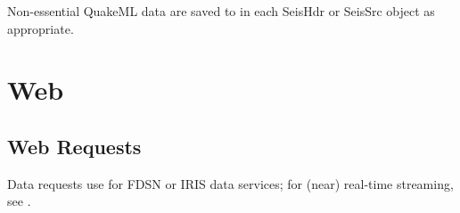 \documentclass[letterpaper,11pt,english]{sphinxmanual}
\begin{document}
Non-essential QuakeML data are saved to  in each SeisHdr or SeisSrc object
as appropriate.


\chapter{Web}
\label{\detokenize{index:web}}

\section{Web Requests}
\label{\detokenize{src/Web/webclients:web-requests}}\label{\detokenize{src/Web/webclients:getdata}}\label{\detokenize{src/Web/webclients::doc}}
Data requests use  for FDSN or IRIS data services; for (near)
real-time streaming, see {\hyperref[\detokenize{src/Web/seedlink:seedlink-section}]{}}.


\begin{fulllineitems}
\end{fulllineitems}



\begin{fulllineitems}
\end{fulllineitems}
\end{document}
